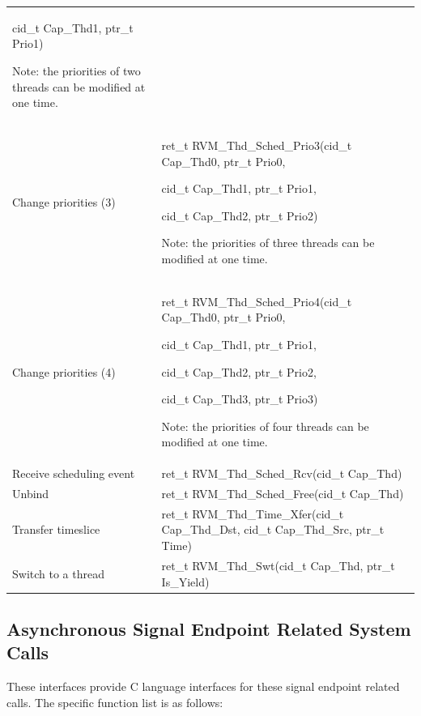 \begin{xltabular}{\textwidth}{@{}>{\hsize\raggedright\arraybackslash}X>{\hsize\raggedright\arraybackslash}X@{}}
cid\_\allowbreak{}t Cap\_\allowbreak{}Thd1, ptr\_\allowbreak{}t Prio1)

Note: the priorities of two threads can be modified at one time.\strut
\tabularnewline
Change priorities (3)\strut
 & ret\_\allowbreak{}t RVM\_\allowbreak{}Thd\_\allowbreak{}Sched\_\allowbreak{}Prio3(cid\_\allowbreak{}t Cap\_\allowbreak{}Thd0, ptr\_\allowbreak{}t Prio0,

cid\_\allowbreak{}t Cap\_\allowbreak{}Thd1, ptr\_\allowbreak{}t Prio1,

cid\_\allowbreak{}t Cap\_\allowbreak{}Thd2, ptr\_\allowbreak{}t Prio2)

Note: the priorities of three threads can be modified at one time.\strut
\tabularnewline
Change priorities (4)\strut
 & ret\_\allowbreak{}t RVM\_\allowbreak{}Thd\_\allowbreak{}Sched\_\allowbreak{}Prio4(cid\_\allowbreak{}t Cap\_\allowbreak{}Thd0, ptr\_\allowbreak{}t Prio0,

cid\_\allowbreak{}t Cap\_\allowbreak{}Thd1, ptr\_\allowbreak{}t Prio1,

cid\_\allowbreak{}t Cap\_\allowbreak{}Thd2, ptr\_\allowbreak{}t Prio2,

cid\_\allowbreak{}t Cap\_\allowbreak{}Thd3, ptr\_\allowbreak{}t Prio3)

Note: the priorities of four threads can be modified at one time.\strut
\tabularnewline
Receive scheduling event & ret\_\allowbreak{}t RVM\_\allowbreak{}Thd\_\allowbreak{}Sched\_\allowbreak{}Rcv(cid\_\allowbreak{}t
Cap\_\allowbreak{}Thd)\tabularnewline
Unbind & ret\_\allowbreak{}t RVM\_\allowbreak{}Thd\_\allowbreak{}Sched\_\allowbreak{}Free(cid\_\allowbreak{}t Cap\_\allowbreak{}Thd)\tabularnewline
Transfer timeslice & ret\_\allowbreak{}t RVM\_\allowbreak{}Thd\_\allowbreak{}Time\_\allowbreak{}Xfer(cid\_\allowbreak{}t Cap\_\allowbreak{}Thd\_\allowbreak{}Dst, cid\_\allowbreak{}t
Cap\_\allowbreak{}Thd\_\allowbreak{}Src, ptr\_\allowbreak{}t Time)\tabularnewline
Switch to a thread & ret\_\allowbreak{}t RVM\_\allowbreak{}Thd\_\allowbreak{}Swt(cid\_\allowbreak{}t Cap\_\allowbreak{}Thd, ptr\_\allowbreak{}t
Is\_\allowbreak{}Yield)\tabularnewline
\end{xltabular}

\subsection{Asynchronous Signal Endpoint Related System Calls}\label{subsec:3-5-6}

These interfaces provide C language interfaces for these signal endpoint related calls. The specific function list is as follows:

